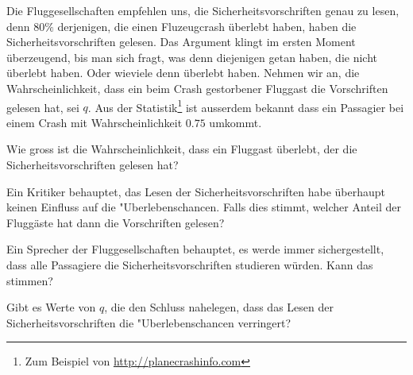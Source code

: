 Die Fluggesellschaften empfehlen uns, die Sicherheitsvorschriften
genau zu lesen, denn $80\%$ derjenigen, die einen Fluzeugcrash
überlebt haben, haben die Sicherheitsvorschriften gelesen.
Das Argument klingt im ersten Moment überzeugend, bis man
sich fragt, was denn diejenigen getan haben, die nicht
überlebt haben. Oder wieviele denn überlebt haben.
Nehmen wir an, die Wahrscheinlichkeit, dass ein
beim Crash gestorbener Fluggast die Vorschriften gelesen hat, sei
$q$.
Aus der Statistik\footnote{Zum Beispiel von \url{http://planecrashinfo.com}}
ist ausserdem bekannt dass ein Passagier bei einem Crash
mit Wahrscheinlichkeit $0.75$ umkommt.
\begin{teilaufgaben}
\item
Wie gross ist die Wahrscheinlichkeit, dass ein Fluggast überlebt, der die
Sicherheitsvorschriften gelesen hat?
\item
Ein Kritiker behauptet, das Lesen der Sicherheitsvorschriften
habe überhaupt keinen Einfluss auf die "Uberlebenschancen.
Falls dies stimmt, welcher Anteil der Fluggäste hat dann die
Vorschriften gelesen?
\item
Ein Sprecher der Fluggesellschaften behauptet, es werde immer sichergestellt,
dass alle Passagiere die Sicherheitsvorschriften studieren würden.
Kann das stimmen?
\item
Gibt es Werte von $q$, die den Schluss nahelegen,
dass das Lesen der Sicherheitsvorschriften
die "Uberlebenschancen verringert?
\end{teilaufgaben}

